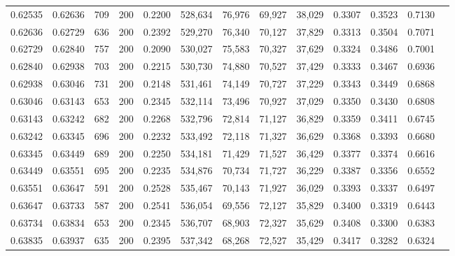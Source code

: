 \begin{tabular}{rrrrrrrrrrrrr}
0.62535 & 0.62636 &   709 & 200 &                                     0.2200 & 528,634 &  76,976 &  69,927 &  38,029 & 0.3307 & 0.3523 & 0.7130 \\
0.62636 & 0.62729 &   636 & 200 &                                     0.2392 & 529,270 &  76,340 &  70,127 &  37,829 & 0.3313 & 0.3504 & 0.7071 \\
0.62729 & 0.62840 &   757 & 200 &                                     0.2090 & 530,027 &  75,583 &  70,327 &  37,629 & 0.3324 & 0.3486 & 0.7001 \\
0.62840 & 0.62938 &   703 & 200 &                                     0.2215 & 530,730 &  74,880 &  70,527 &  37,429 & 0.3333 & 0.3467 & 0.6936 \\
0.62938 & 0.63046 &   731 & 200 &                                     0.2148 & 531,461 &  74,149 &  70,727 &  37,229 & 0.3343 & 0.3449 & 0.6868 \\
0.63046 & 0.63143 &   653 & 200 &                                     0.2345 & 532,114 &  73,496 &  70,927 &  37,029 & 0.3350 & 0.3430 & 0.6808 \\
0.63143 & 0.63242 &   682 & 200 &                                     0.2268 & 532,796 &  72,814 &  71,127 &  36,829 & 0.3359 & 0.3411 & 0.6745 \\
0.63242 & 0.63345 &   696 & 200 &                                     0.2232 & 533,492 &  72,118 &  71,327 &  36,629 & 0.3368 & 0.3393 & 0.6680 \\
0.63345 & 0.63449 &   689 & 200 &                                     0.2250 & 534,181 &  71,429 &  71,527 &  36,429 & 0.3377 & 0.3374 & 0.6616 \\
0.63449 & 0.63551 &   695 & 200 &                                     0.2235 & 534,876 &  70,734 &  71,727 &  36,229 & 0.3387 & 0.3356 & 0.6552 \\
0.63551 & 0.63647 &   591 & 200 &                                     0.2528 & 535,467 &  70,143 &  71,927 &  36,029 & 0.3393 & 0.3337 & 0.6497 \\
0.63647 & 0.63733 &   587 & 200 &                                     0.2541 & 536,054 &  69,556 &  72,127 &  35,829 & 0.3400 & 0.3319 & 0.6443 \\
0.63734 & 0.63834 &   653 & 200 &                                     0.2345 & 536,707 &  68,903 &  72,327 &  35,629 & 0.3408 & 0.3300 & 0.6383 \\
0.63835 & 0.63937 &   635 & 200 &                                     0.2395 & 537,342 &  68,268 &  72,527 &  35,429 & 0.3417 & 0.3282 & 0.6324 \\

\end{tabular}

